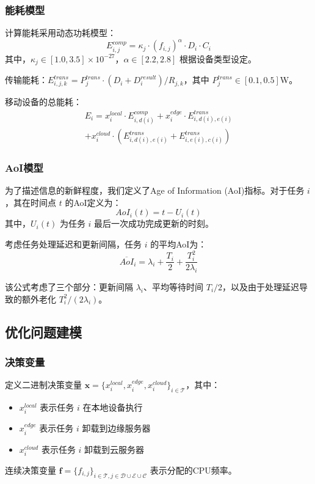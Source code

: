 \documentclass[conference]{IEEEtran}
\begin{document}
\subsubsection{能耗模型}
计算能耗采用动态功耗模型：
\begin{equation}
E_{i,j}^{comp} = \kappa_j \cdot (f_{i,j})^{\alpha} \cdot D_i \cdot C_i
\end{equation}
其中，$\kappa_j \in [1.0, 3.5] \times 10^{-27}$，$\alpha \in [2.2, 2.8]$ 根据设备类型设定。

传输能耗：$E_{i,j,k}^{trans} = P_j^{trans} \cdot (D_i + D_i^{result})/R_{j,k}$，其中 $P_j^{trans} \in [0.1, 0.5]$W。

移动设备的总能耗：
\begin{equation}
    \begin{split}
        E_i = x_{i}^{local} \cdot E_{i,d(i)}^{comp} + x_{i}^{edge} \cdot E_{i,d(i),e(i)}^{trans} \\ + x_{i}^{cloud} \cdot (E_{i,d(i),e(i)}^{trans} + E_{i,e(i),c(i)}^{trans})
    \end{split}
\end{equation}

\subsubsection{AoI模型}
为了描述信息的新鲜程度，我们定义了Age of Information (AoI)指标。对于任务 $i$，其在时间点 $t$ 的AoI定义为：
\begin{equation}
AoI_i(t) = t - U_i(t)
\end{equation}
其中，$U_i(t)$ 为任务 $i$ 最后一次成功完成更新的时刻。

考虑任务处理延迟和更新间隔，任务 $i$ 的平均AoI为：
\begin{equation}
\overline{AoI}_i = \lambda_i + \frac{T_i}{2} + \frac{T_i^2}{2\lambda_i}
\end{equation}

该公式考虑了三个部分：更新间隔 $\lambda_i$、平均等待时间 $T_i/2$，以及由于处理延迟导致的额外老化 $T_i^2/(2\lambda_i)$。

\subsection{优化问题建模}
\subsubsection{决策变量}
定义二进制决策变量 $\mathbf{x} = \{x_i^{local}, x_i^{edge}, x_i^{cloud}\}_{i \in \mathcal{T}}$，其中：
\begin{itemize}
    \item $x_{i}^{local}$ 表示任务 $i$ 在本地设备执行
    \item $x_{i}^{edge}$ 表示任务 $i$ 卸载到边缘服务器
    \item $x_{i}^{cloud}$ 表示任务 $i$ 卸载到云服务器
\end{itemize}
连续决策变量 $\mathbf{f} = \{f_{i,j}\}_{i \in \mathcal{T}, j \in \mathcal{D} \cup \mathcal{E} \cup \mathcal{C}}$ 表示分配的CPU频率。
\end{document}
